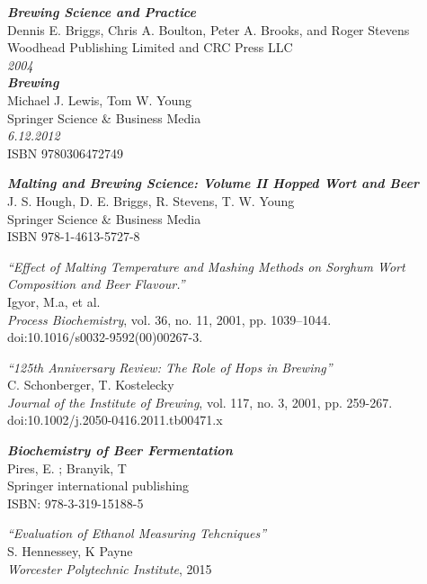 \documentclass[twoside]{ctuthesis}
\theoremstyle{plain}
\theoremstyle{definition}
\theoremstyle{note}
\begin{document}
%
%
\begin{thebibliography}{9}
	\textit{\textbf{Brewing Science and Practice}}\\
	Dennis E. Briggs, Chris A. Boulton, Peter A. Brooks, and Roger Stevens\\
	Woodhead Publishing Limited and CRC Press LLC\\
	\textit{2004}\\
	
	\textit{\textbf{Brewing}}\\
	Michael J. Lewis, Tom W. Young\\
	Springer Science \& Business Media\\
	\textit{6.12.2012}\\
	ISBN 9780306472749
	
	\textit{\textbf{Malting and Brewing Science: Volume II Hopped Wort and Beer}}\\
	J. S. Hough, D. E. Briggs, R. Stevens, T. W. Young\\
	Springer Science \& Business Media\\
	ISBN 978-1-4613-5727-8
	
	\textit{“Effect of Malting Temperature and Mashing Methods on Sorghum Wort Composition and Beer Flavour.”} \\
	Igyor, M.a, et al. \\
	\textit{Process Biochemistry}, vol. 36, no. 11, 2001, pp. 1039–1044.\\
	doi:10.1016/s0032-9592(00)00267-3.
	
	\textit{“125th Anniversary Review: The Role of Hops in Brewing”}\\
	C. Schonberger, T. Kostelecky\\
	\textit{Journal of the Institute of Brewing}, vol. 117, no. 3, 2001, pp. 259-267.\\
	doi:10.1002/j.2050-0416.2011.tb00471.x
	
	\textit{\textbf{Biochemistry of Beer Fermentation}}\\
	Pires, E. ; Branyik, T\\
	Springer international publishing\\
	ISBN: 978-3-319-15188-5
	
	\textit{“Evaluation of Ethanol Measuring Tehcniques”}\\
	S. Hennessey, K Payne\\
	\textit{Worcester Polytechnic Institute}, 2015\\
	
	
\end{thebibliography}

\end{document}
